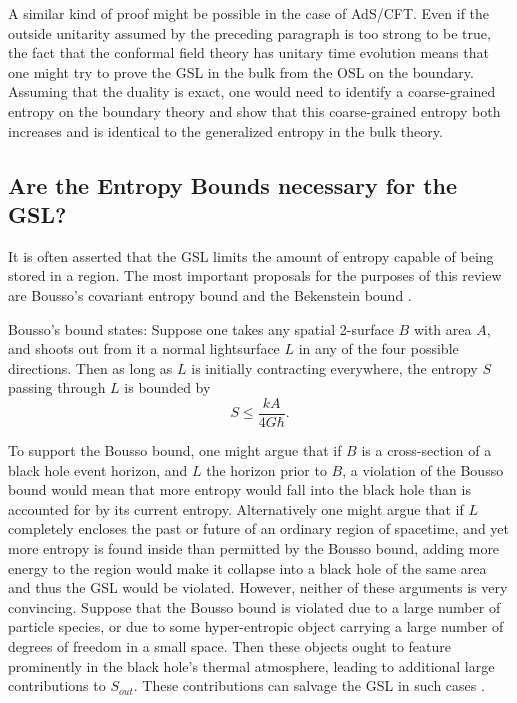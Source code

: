 \documentclass[12pt]{article}
\begin{document}
A similar kind of proof might be possible in the case of AdS/CFT.  Even if the outside unitarity assumed by the preceding paragraph is too strong to be true, the fact that the conformal field theory has unitary time evolution means that one might try to prove the GSL in the bulk from the OSL on the boundary.  Assuming that the duality is exact, one would need to identify a coarse-grained entropy on the boundary theory and show that this coarse-grained entropy both increases and is identical to the generalized entropy in the bulk theory.

\subsection{Are the Entropy Bounds necessary for the GSL?}\label{bounds}

It is often asserted that the GSL limits the amount of entropy capable of being stored in a region.  The most important proposals for the purposes of this review are Bousso's covariant entropy bound \cite{bousso99} and the Bekenstein bound \cite{bek81}.

Bousso's bound states:  Suppose one takes any spatial 2-surface $B$ with area $A$, and shoots out from it a normal lightsurface $L$ in any of the four possible directions.  Then as long as $L$ is initially contracting everywhere, the entropy $S$ passing through $L$ is bounded by
\begin{equation}
S \le \frac{kA}{4G\hbar}.
\end{equation}

To support the Bousso bound, one might argue that if $B$ is a cross-section of a black hole event horizon, and $L$ the horizon prior to $B$, a violation of the Bousso bound would mean that more entropy would fall into the black hole than is accounted for by its current entropy.  Alternatively one might argue that if $L$ completely encloses the past or future of an ordinary region of spacetime, and yet more entropy is found inside than permitted by the Bousso bound, adding more energy to the region would make it collapse into a black hole of the same area and thus the GSL would be violated.  However, neither of these arguments is very convincing.  Suppose that the Bousso bound is violated due to a large number of particle species, or due to some hyper-entropic object carrying a large number of degrees of freedom in a small space.  Then these objects ought to feature prominently in the black hole's thermal atmosphere, leading to additional large contributions to $S_{out}$.  These contributions can salvage the GSL in such cases \cite{MS03}.
\end{document}
